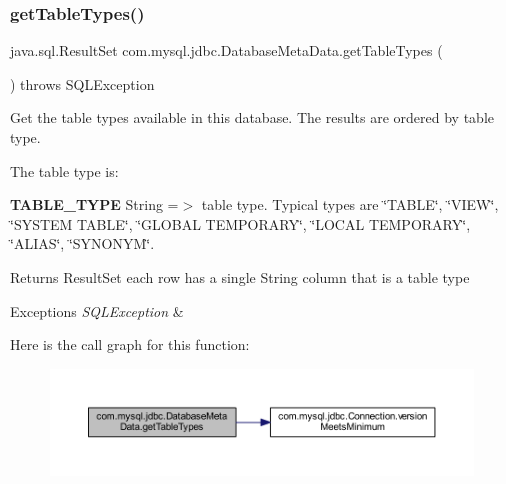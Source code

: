 \subsubsection{\texorpdfstring{get\+Table\+Types()}{getTableTypes()}}
{\footnotesize\ttfamily java.\+sql.\+Result\+Set com.\+mysql.\+jdbc.\+Database\+Meta\+Data.\+get\+Table\+Types (\begin{DoxyParamCaption}{ }\end{DoxyParamCaption}) throws S\+Q\+L\+Exception}

Get the table types available in this database. The results are ordered by table type. 

The table type is\+: 
\begin{DoxyEnumerate}
\item {\bfseries T\+A\+B\+L\+E\+\_\+\+T\+Y\+PE} String =$>$ table type. Typical types are \char`\"{}\+T\+A\+B\+L\+E\char`\"{}, \char`\"{}\+V\+I\+E\+W\char`\"{}, \char`\"{}\+S\+Y\+S\+T\+E\+M T\+A\+B\+L\+E\char`\"{}, \char`\"{}\+G\+L\+O\+B\+A\+L T\+E\+M\+P\+O\+R\+A\+R\+Y\char`\"{}, \char`\"{}\+L\+O\+C\+A\+L T\+E\+M\+P\+O\+R\+A\+R\+Y\char`\"{}, \char`\"{}\+A\+L\+I\+A\+S\char`\"{}, \char`\"{}\+S\+Y\+N\+O\+N\+Y\+M\char`\"{}.  
\end{DoxyEnumerate}

\begin{DoxyReturn}{Returns}
Result\+Set each row has a single String column that is a table type 
\end{DoxyReturn}

\begin{DoxyExceptions}{Exceptions}
{\em S\+Q\+L\+Exception} & \\
\hline
\end{DoxyExceptions}
Here is the call graph for this function\+:
\nopagebreak
\begin{figure}[H]
\begin{center}
\leavevmode
\includegraphics[width=350pt]{classcom_1_1mysql_1_1jdbc_1_1_database_meta_data_afbd77b1301f7cfe5feb6f0b6e44ba44e_cgraph}
\end{center}
\end{figure}
\mbox{\label{classcom_1_1mysql_1_1jdbc_1_1_database_meta_data_a5e54b986962220c3bb4372cd8029e452}} 
